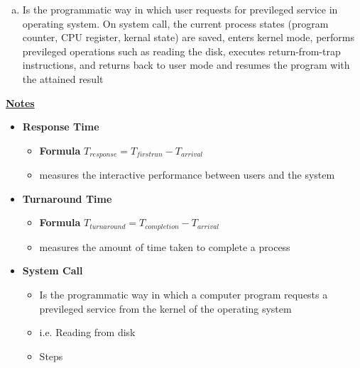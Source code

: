 \documentclass[12pt]{article}
\begin{document}
\begin{enumerate}[1.]
\begin{enumerate}[a)]
        \item Is the programmatic way in which user requests for previleged service in operating system.
        On system call, the current process states (program counter, CPU register, kernal state) are saved,
        enters kernel mode, performs previleged operations such as reading the disk,
        executes return-from-trap instructions, and returns back to user mode and resumes
        the program with the attained result
    \end{enumerate}

    \bigskip

    \underline{\textbf{Notes}}

    \begin{itemize}
        \item \textbf{Response Time}
        \begin{itemize}
            \item \textbf{Formula} $T_{response} = T_{firstrun} - T_{arrival}$
            \item measures the interactive performance between users and the system
        \end{itemize}

        \item \textbf{Turnaround Time}

        \begin{itemize}
            \item \textbf{Formula} $T_{turnaround} = T_{completion} - T_{arrival}$
            \item measures the amount of time taken to complete a process
        \end{itemize}

        \item \textbf{System Call}

        \begin{itemize}
            \item Is the programmatic way in which a computer program requests a previleged service from the kernel of the operating system
            \item i.e. Reading from disk
            \item Steps


\end{itemize}
\end{itemize}
\end{enumerate}
\end{document}
